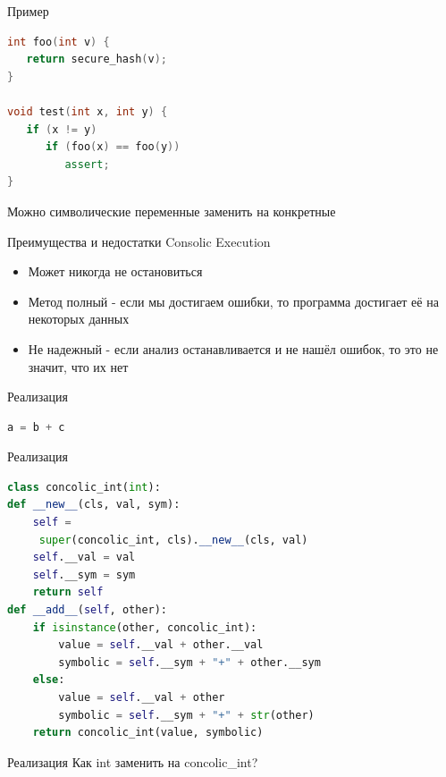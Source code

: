 \documentclass{beamer}
\begin{document}
\begin{frame}[fragile]{Пример}
\begin{minipage}{0.40\textwidth}
\begin{lstlisting}[language=C++]
int foo(int v) {
   return secure_hash(v);
}

void test(int x, int y) {
   if (x != y)
      if (foo(x) == foo(y))
         assert;
}
\end{lstlisting}
\end{minipage}
\hfill
\begin{minipage}{0.40\textwidth}
Можно символические переменные заменить на конкретные
\end{minipage}
\end{frame}

\begin{frame}{Преимущества и недостатки Consolic Execution}
\begin{itemize}
\item Может никогда не остановиться
\item Метод полный - если мы достигаем ошибки, то программа достигает её на некоторых данных
\item Не надежный - если анализ останавливается и не нашёл ошибок, то это не значит, что их нет
\end{itemize}
\end{frame}

\begin{frame}[fragile]{Реализация}
\begin{lstlisting}[language=python,escapechar=@]
a = b + c
\end{lstlisting}
\end{frame}

\begin{frame}[fragile]{Реализация}
\begin{lstlisting}[language=python,escapechar=@]
class concolic_int(int):
def __new__(cls, val, sym):
    self =
     super(concolic_int, cls).__new__(cls, val)
    self.__val = val
    self.__sym = sym
    return self
def __add__(self, other):
    if isinstance(other, concolic_int):
        value = self.__val + other.__val
        symbolic = self.__sym + "+" + other.__sym
    else:
        value = self.__val + other
        symbolic = self.__sym + "+" + str(other)
    return concolic_int(value, symbolic)
\end{lstlisting}
\end{frame}

\begin{frame}[fragile]{Реализация}
Как int заменить на concolic\_int?
\end{frame}
\end{document}
